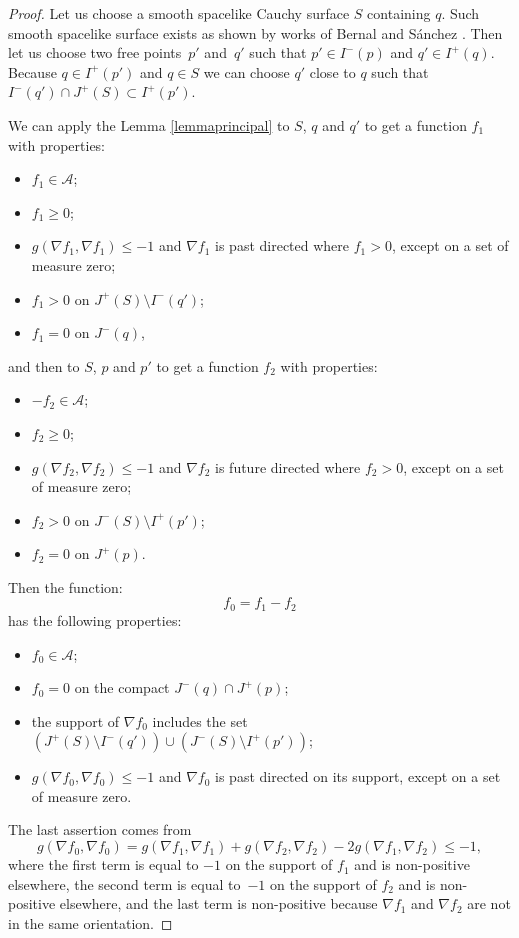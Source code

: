 \documentclass[pdftex]{sigma}
\newcommand{\parenthese}[1]{\left( {#1} \right)}
\begin{document}
\begin{proof}
Let us choose a smooth spacelike Cauchy surface $S$ containing $q$. Such smooth spacelike surface exists as shown by works of Bernal and S\'anchez \cite{BS03,BS04}. Then let us choose two free points~$p'$ and~$q'$ such that $p' \in I^-(p)$ and $q' \in I^+(q)$.  Because $q \in I^+(p')$ and $q\in S$ we can choose $q'$ close to $q$ such that $I^-(q') \cap J^+(S) \subset I^+(p')$.

We can apply the Lemma \ref{lemmaprincipal} to $S$, $q$ and $q'$ to get a function $f_1$ with properties:
\begin{itemize}\itemsep=0pt
\item $f_1 \in \mathcal A$;
\item $f_1 \geq 0 $;
\item $g( \nabla f_1, \nabla f_1 ) \leq -1$ and $\nabla f_1$ is past directed where $f_1 > 0$, except on a set of measure zero;
\item $f _1> 0$ on $J^+(S) \setminus I^-(q')$;
\item $f_1 = 0$ on $J^-(q)$,
\end{itemize}
and then to $S$, $p$ and $p'$ to get a function $f_2$ with properties:
\begin{itemize}\itemsep=0pt
\item $-f_2 \in \mathcal A$;
\item $f_2 \geq 0 $;
\item $g( \nabla f_2, \nabla f_2 ) \leq -1$ and $\nabla f_2$ is future directed where $f_2> 0$, except on a set of measure zero;
\item $f_2 > 0$ on $J^-(S) \setminus I^+(p')$;
\item $f_2 = 0$ on $J^+(p)$.
\end{itemize}

Then the function:
\[
f_0 = f_1 - f_2
\]
has the following properties:
\begin{itemize}\itemsep=0pt
\item $f_0\in\mathcal A$;
\item $f_0 = 0$ on the compact $J^-(q) \cap J^+(p)$;
\item the support of $\nabla f_0$ includes the set $\parenthese{J^+(S) \setminus I^-(q')} \cup  \parenthese{J^-(S) \setminus I^+(p')}$;
\item $g( \nabla f_0, \nabla f_0) \leq -1$ and $\nabla f_0$ is past directed on its support, except on a set of measure zero.
\end{itemize}
The last assertion comes from
\[
g( \nabla f_0, \nabla f_0 ) =  g( \nabla f_1, \nabla f_1 ) + g( \nabla f_2, \nabla f_2 ) -  2 g( \nabla f_1, \nabla f_2 ) \leq -1,
\]
where the f\/irst term is equal to $-1$ on the support of $f_1$ and is non-positive elsewhere, the second term is equal to~$-1$ on the support of $f_2$ and is non-positive elsewhere, and the last term is non-positive because $\nabla f_1$ and $\nabla f_2$ are not in the same orientation.


\end{proof}
\end{document}

